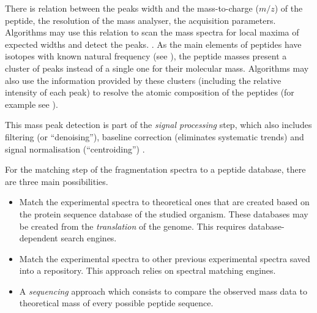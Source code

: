 There is relation between the peaks width and the mass-to-charge ($m/z$) of
the peptide, the resolution of the mass analyser, the acquisition parameters.
Algorithms may use this relation to scan the mass spectra for local maxima of
expected widths and detect the peaks. .
As the main elements of peptides have isotopes with known natural frequency
(see ), the peptide masses present a cluster of peaks instead
of a single one for their molecular mass. Algorithms may also use the information
provided by these clusters (including the relative intensity of each peak) to
resolve the atomic composition of the peptides (for example see ).

This mass peak detection is part of the \emph{signal processing} step, which also
includes filtering (or \enquote{denoising}), baseline correction (eliminates
systematic trends) and signal normalisation (\enquote{centroiding})
.


For the matching step of the fragmentation spectra to a peptide database,
there are three main possibilities.
\begin{itemize}
    \item Match the experimental spectra to theoretical ones that are created
         based on the protein sequence database of the studied
        organism. These databases may be created from the \emph{
        translation} of the genome. This requires database-dependent search engines.
    \item Match the experimental spectra to other previous experimental spectra
        saved into a repository. This approach relies on spectral matching engines.
    \item A  \emph{sequencing} approach which consists to compare
        the observed mass data to theoretical mass of every possible peptide
        sequence.
\end{itemize}


